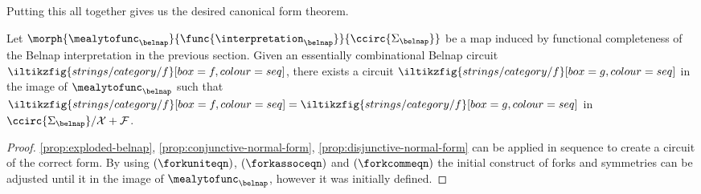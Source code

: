 Putting this all together gives us the desired canonical form theorem.

\begin{theorem}
    Let \(
    \morph{\mealytofunc_\belnap}{\func{\interpretation_{\belnap}}}{\ccirc{\Sigma_\belnap}}
    \) be a map induced by functional completeness of the Belnap interpretation
    in the previous section.
    Given an essentially combinational Belnap circuit \(
    \iltikzfig{strings/category/f}[box=f,colour=seq]
    \), there exists a circuit \(
    \iltikzfig{strings/category/f}[box=g,colour=seq]
    \) in the image of \(\mealytofunc_\belnap\) such that \(
    \iltikzfig{strings/category/f}[box=f,colour=seq]
    =
    \iltikzfig{strings/category/f}[box=g,colour=seq]
    \) in \(\ccirc{\Sigma_\belnap} / \mathcal{X} + \mathcal{F}\).
\end{theorem}
\begin{proof}
    \cref{prop:exploded-belnap}, \cref{prop:conjunctive-normal-form},
    \cref{prop:disjunctive-normal-form} can be applied in
    sequence to create a circuit of the correct form.
    By using \((\forkuniteqn)\), \((\forkassoceqn)\) and \((\forkcommeqn)\) the
    initial construct of forks and symmetries can be adjusted until it in the
    image of \(\mealytofunc_\belnap\), however it was initially defined.
\end{proof}
